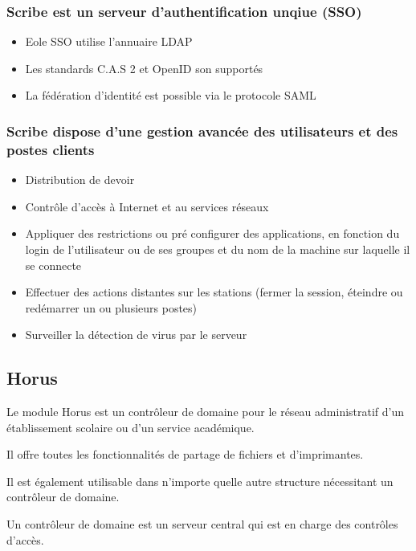 \subsubsection{Scribe est un serveur d'authentification unqiue (SSO)}

\begin{itemize}
  \item Eole SSO utilise l'annuaire LDAP
  \item Les standards C.A.S 2 et OpenID son supportés
  \item La fédération d'identité est possible via le protocole SAML
\end{itemize}

\subsubsection{Scribe dispose d'une gestion avancée des utilisateurs et 
               des postes clients}

\begin{itemize}
  \item Distribution de devoir
  \item Contrôle d'accès à Internet et au services réseaux
  \item Appliquer des restrictions ou pré configurer des applications, en
        fonction du login de l'utilisateur ou de ses groupes et du nom de 
        la machine sur laquelle il se connecte
  \item Effectuer des actions distantes sur les stations (fermer la 
        session, éteindre ou redémarrer un ou plusieurs postes)
  \item Surveiller la détection de virus par le serveur
\end{itemize}


\subsection{Horus}

Le module Horus est un contrôleur de domaine pour le réseau administratif 
d'un établissement scolaire ou d'un service académique.

Il offre toutes les fonctionnalités de partage de fichiers et d'imprimantes.

Il est également utilisable dans n'importe quelle autre structure 
nécessitant un contrôleur de domaine.

Un contrôleur de domaine est un serveur central qui est en charge des 
contrôles d'accès.


